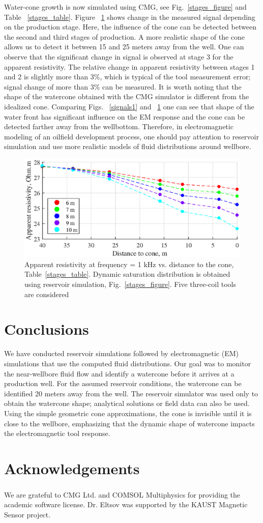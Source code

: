 \documentclass{eage19}
\begin{document}
Water-cone growth is now simulated using CMG, see  Fig.~\ref{stages_figure} and Table ~\ref{stages_table}. Figure ~\ref{signals2} shows change in the measured signal depending on the production stage. Here, the influence of the cone can be detected between the second and third stages of production. A more realistic shape of the cone allows us to detect it between 15 and 25 meters away from the well. One can observe that the significant change in signal is observed at stage 3 for the apparent resistivity. The relative change in apparent resistivity between  stages 1 and 2 is slightly more than 3\%, which is typical of the tool measurement error; signal change of more than 3\% can be measured. It is worth noting that the shape of the watercone obtained with the CMG simulator is different from the idealized cone. Comparing Figs. ~\ref{signals1} and ~\ref{signals2} one can see that shape of the water front has significant influence on the EM response and the cone can be detected farther away from the wellbottom. Therefore, in electromagnetic modeling of an oilfield development process, one should pay attention to reservoir simulation and use more realistic models of fluid distributions around wellbore.

\begin{figure}[h!]
	\centering
	\includegraphics[clip,width=0.85\linewidth]{phase_diff_cmg.eps}
	\caption{Apparent resistivity at frequency = 1 kHz vs. distance to the cone, Table~\ref{stages_table}. Dynamic saturation distribution is obtained using reservoir simulation, Fig.~\ref{stages_figure}. Five three-coil tools are considered}
	\label{signals2}
\end{figure}

\section{Conclusions}

We have conducted reservoir simulations followed by electromagnetic (EM) simulations that use the computed fluid distributions. Our goal was to monitor the  near-wellbore fluid flow and identify a watercone before it arrives at a production well. For the assumed reservoir conditions, the watercone can be identified 20 meters away from the well. The reservoir simulator was used only to obtain the watercone shape; analytical solutions or field data can also be used. Using the simple geometric cone approximations, the cone is invisible until it is close to the wellbore, emphasizing that the dynamic shape of watercone impacts the electromagnetic tool response.


\section{Acknowledgements}

We are grateful to CMG Ltd. and COMSOL Multiphysics\textsuperscript{\textregistered} for providing the academic software license. Dr. Eltsov was supported by the KAUST Magnetic Sensor project.



\end{document}
